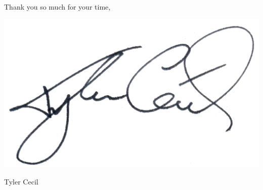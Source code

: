 \documentclass{tc_cv}
\begin{document}
\begin{adjustwidth}{38pt}{38pt}

  \begin{minipage}{0.5\linewidth}
    Thank you so much for your time,
    \vspace{1em}
  \end{minipage}
  \begin{minipage}{0.5\linewidth}
    \hfill\includegraphics[height=4.5\baselineskip]{sig}

    \vspace{-2em}
    \hfill Tyler Cecil
  \end{minipage}

\end{adjustwidth}
\end{document}
